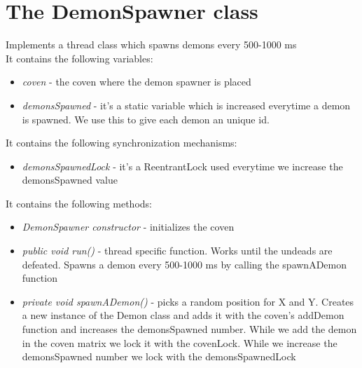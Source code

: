 \documentclass[14pt]{article}
\begin{document}
\section*{The DemonSpawner class}
\vspace{5 mm}
Implements a thread class which spawns demons every 500-1000 ms\\
It contains the following variables:\\ 
\begin{itemize}
            \item \textit{coven} - the coven where the demon spawner is placed
            \item \textit{demonsSpawned} - it's a static variable which is increased everytime a demon is spawned. We use this to give each demon an unique id.
\end{itemize}
It contains the following synchronization mechanisms:\\
\begin{itemize}
            \item \textit{demonsSpawnedLock} - it's a ReentrantLock used everytime we increase the demonsSpawned value
\end{itemize}
It contains the following methods:\\
\begin{itemize}
            \item \textit{DemonSpawner constructor} - initializes the coven
            \item \textit{public void run()} - thread specific function. Works until the undeads are defeated. Spawns a demon every 500-1000 ms by calling the spawnADemon function
            \item \textit{private void spawnADemon()} - picks a random position for X and Y. Creates a new instance of the Demon class and adds it with the coven's addDemon function and increases the demonsSpawned number. While we add the demon in the coven matrix we lock it with the covenLock. While we increase the demonsSpawned number we lock with the demonsSpawnedLock
\end{itemize}
\end{document}
